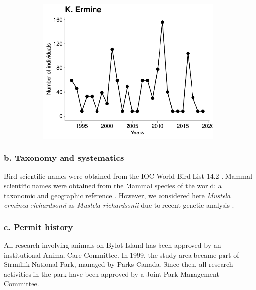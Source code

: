 \documentclass[a4paper,twoside,12pt]{article}
\begin{document}
\begin{figure}[h]
\begin{subfigure}{0.45\textwidth}
    \includegraphics[width=\linewidth]{figures/species_temporal_series/Ermine.pdf}
  \end{subfigure}
\end{figure}
\newpage

\newpage
                        
                        \subsubsection*{b. Taxonomy and systematics}
       Bird scientific names were obtained from the IOC World Bird List 14.2 \citep{gill2024}. Mammal scientific names were obtained from the Mammal species of the world: a taxonomic and geographic reference \citep{wilson2005}. However, we considered here \textit{Mustela erminea richardsonii} as \textit{Mustela richardsonii} due to recent genetic analysis \citep{colella2021}.
                        
                        \subsubsection*{c. Permit history}
      All research involving animals on Bylot Island has been approved by an institutional Animal Care Committee. In 1999, the study area became part of Sirmiliik National Park, managed by Parks Canada. Since then, all research activities in the park have been approved by a Joint Park Management Committee.
      
\end{document}
